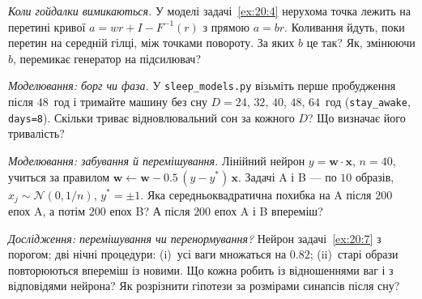 \begin{exercise}[\lvlB]
\label{ex:20:5}
\emph{Коли гойдалки вимикаються.} У моделі задачі~\ref{ex:20:4} нерухома точка лежить на перетині кривої $a=wr+I-F^{-1}(r)$ з прямою $a=br$. Коливання йдуть, поки перетин на середній гілці, між точками повороту. За яких $b$ це так? Як, змінюючи $b$,  перемикає генератор на підсилювач?
\end{exercise}

\begin{exercise}[\lvlB]
\label{ex:20:6}
\emph{Моделювання: борг чи фаза.} У \texttt{sleep\_models.py} візьміть перше пробудження після $48$~год і тримайте машину без сну $D=24$, $32$, $40$, $48$, $64$~год (\texttt{stay\_awake}, \texttt{days=8}). Скільки триває відновлювальний сон за кожного $D$? Що визначає його тривалість?
\end{exercise}

\begin{exercise}[\lvlB]
\label{ex:20:7}
\emph{Моделювання: забування й перемішування.} Лінійний нейрон $y=\mathbf w\cdot\mathbf x$, $n=40$, учиться за правилом $\mathbf w\leftarrow\mathbf w-0.5\,(y-y^*)\,\mathbf x$. Задачі A і B --- по $10$ образів, $x_j\sim\mathcal N(0,1/n)$, $y^*=\pm1$. Яка середньоквадратична похибка на A після $200$ епох A, а потім $200$ епох B? А після $200$ епох A і B впереміш?
\end{exercise}

\begin{exercise}[\lvlC]
\label{ex:20:8}
\emph{Дослідження: перемішування чи перенормування?} Нейрон задачі~\ref{ex:20:7} з порогом; дві нічні процедури: (i)~усі ваги множаться на $0.82$; (ii)~старі образи повторюються впереміш із новими. Що кожна робить із відношеннями ваг і з відповідями нейрона? Як розрізнити гіпотези за розмірами синапсів після сну?
\end{exercise}

